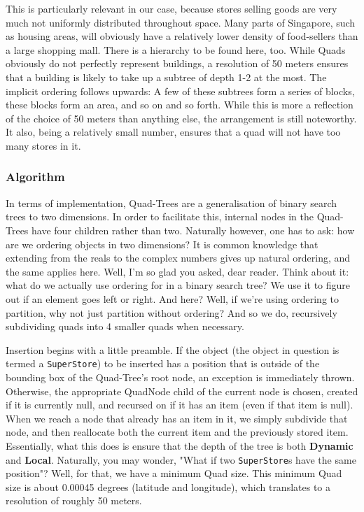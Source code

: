 \documentclass[12pt]{article}
\begin{document}
{This is particularly relevant in our case, because stores selling goods are very much not uniformly distributed throughout space. Many parts of Singapore, such as housing areas, will obviously have a relatively lower density of food-sellers than a large shopping mall. There is a hierarchy to be found here, too. While Quads obviously do not perfectly represent buildings, a resolution of 50 meters ensures that a building is likely to take up a subtree of depth 1-2 at the most. The implicit ordering follows upwards: A few of these subtrees form a series of blocks, these blocks form an area, and so on and so forth. While this is more a reflection of the choice of 50 meters than anything else, the arrangement is still noteworthy. It also, being a relatively small number, ensures that a quad will not have too many stores in it.

\subsubsection{Algorithm}

In terms of implementation, Quad-Trees are a generalisation of binary search trees to two dimensions. In order to facilitate this, internal nodes in the Quad-Trees have four children rather than two. Naturally however, one has to ask: how are we ordering objects in two dimensions? It is common knowledge that extending from the reals to the complex numbers gives up natural ordering, and the same applies here. Well, I'm so glad you asked, dear reader. Think about it: what do we actually use ordering for in a binary search tree? We use it to figure out if an element goes left or right. And here? Well, if we're using ordering to partition, why not just partition without ordering? And so we do, recursively subdividing quads into 4 smaller quads when necessary.

Insertion begins with a little preamble. If the object (the object in question is termed a \texttt{SuperStore}) to be inserted has a position that is outside of the bounding box of the Quad-Tree's root node, an exception is immediately thrown. Otherwise, the appropriate QuadNode child of the current node is chosen, created if it is currently null, and recursed on if it has an item (even if that item is null). When we reach a node that already has an item in it, we simply subdivide that node, and then reallocate both the current item and the previously stored item. Essentially, what this does is ensure that the depth of the tree is both \textbf{Dynamic} and \textbf{Local}. Naturally, you may wonder, "What if two \texttt{SuperStore}s have the same position"? Well, for that, we have a minimum Quad size. This minimum Quad size is about 0.00045 degrees (latitude and longitude), which translates to a resolution of roughly 50 meters.

}
\end{document}

